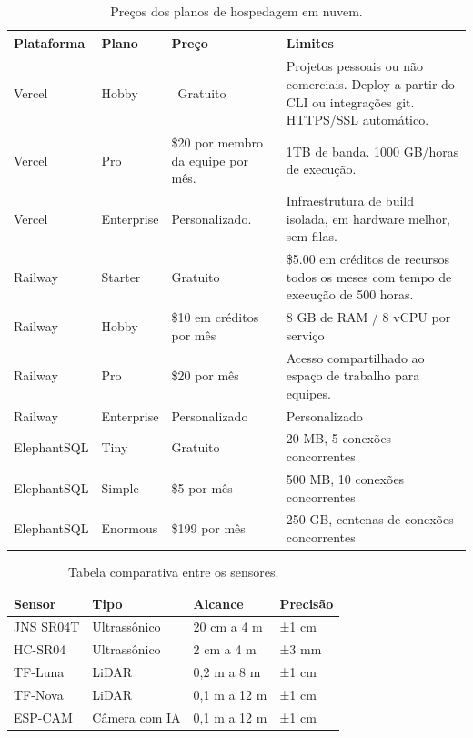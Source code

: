 \begin{table}[htb]
	\ABNTEXfontereduzida
	\caption{\label{tab:Tab_1}Preços dos planos de hospedagem em nuvem.}
 \begin{center}
	\begin{tabular}{@{}p{2.0cm}p{1.5cm}p{3.0cm}p{3.5cm}@{}}
		\toprule
		\textbf{Plataforma} & \textbf{Plano} & \textbf{Preço} & \textbf{Limites} \\ \midrule
		Vercel & Hobby & \ Gratuito & Projetos pessoais ou não comerciais. Deploy a partir do CLI ou integrações git. HTTPS/SSL automático. \\
		Vercel & Pro & \$20 por membro da equipe por mês. & 1TB de banda. 1000 GB/horas de execução. \\
		Vercel & Enterprise & Personalizado. & Infraestrutura de build isolada, em hardware melhor, sem filas. \\
		Railway & Starter & Gratuito & \$5.00 em créditos de recursos todos os meses com tempo de execução de 500 horas. \\
		Railway & Hobby & \$10 em créditos por mês & 8 GB de RAM / 8 vCPU por serviço \\
		Railway & Pro & \$20 por mês & Acesso compartilhado ao espaço de trabalho para equipes. \\
		Railway & Enterprise & Personalizado & Personalizado \\
		ElephantSQL & Tiny & Gratuito & 20 MB, 5 conexões concorrentes \\
		ElephantSQL & Simple & \$5 por mês & 500 MB, 10 conexões concorrentes \\
            ElephantSQL & Enormous & \$199 por mês & 250 GB, centenas de conexões concorrentes \\
  \bottomrule
	\end{tabular}
 \end{center}
\end{table}


\begin{table}
	\ABNTEXfontereduzida
	\caption{\label{tab:Tab_2}Tabela comparativa entre os sensores.}
 \begin{center}
	\begin{tabular}{@{}p{2.0cm}p{1.5cm}p{3.0cm}p{3.5cm}@{}}
		\toprule
		\textbf{Sensor} & \textbf{Tipo} & \textbf{Alcance} & \textbf{Precisão} \\ \midrule
		JNS SR04T & Ultrassônico & 20 cm a 4 m & ±1 cm \\
		HC-SR04 & Ultrassônico & 2 cm a 4 m & ±3 mm \\
		TF-Luna & LiDAR & 0,2 m a 8 m & ±1 cm \\
		TF-Nova & LiDAR & 0,1 m a 12 m & ±1 cm \\
		ESP-CAM & Câmera com IA & 0,1 m a 12 m & ±1 cm \\ 
  \bottomrule
	\end{tabular}
 \end{center}
	\label{tab:comparativo}
\end{table}



